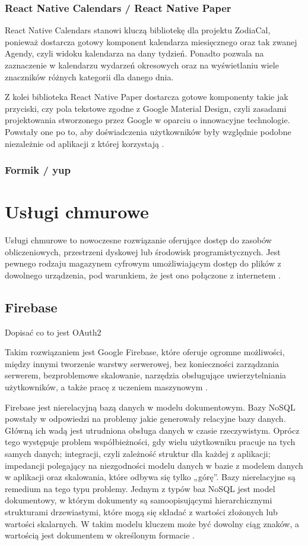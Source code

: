 \subsubsection*{\textbf{React Native Calendars / React Native Paper}}
React Native Calendars stanowi kluczą bibliotekę dla projektu ZodiaCal, ponieważ dostarcza gotowy komponent kalendarza miesięcznego oraz tak zwanej Agendy, czyli widoku kalendarza na dany tydzień. Ponadto pozwala na zaznaczenie w kalendarzu wydarzeń okresowych oraz na wyświetlaniu wiele znaczników różnych kategorii dla danego dnia.

Z kolei biblioteka React Native Paper dostarcza gotowe komponenty takie jak przyciski, czy pola tekstowe zgodne z Google Material Design, czyli zasadami projektowania stworzonego przez Google w oparciu o innowacyjne technologie. Powstały one po to, aby doświadczenia użytkowników były względnie podobne niezależnie od aplikacji z której korzystają \cite{uxui}.

\subsubsection*{\textbf{Formik / yup}}

\section*{\textbf{Usługi chmurowe}}
Usługi chmurowe to nowoczesne rozwiązanie oferujące dostęp do zasobów obliczeniowych, przestrzeni dyskowej lub środowisk programistycznych. Jest pewnego rodzaju magazynem cyfrowym umożliwiającym dostęp do plików z dowolnego urządzenia, pod warunkiem, że jest ono połączone z internetem \cite{cloud}.

\subsection*{\textbf{Firebase}}
Dopisać co to jest OAuth2

Takim rozwiązaniem jest Google Firebase, które oferuje ogromne możliwości, między innymi tworzenie warstwy serwerowej, bez konieczności zarządzania serwerem, bezproblemowe skalowanie, narzędzia obsługujące uwierzytelniania użytkowników, a także pracę z uczeniem maszynowym \cite{firebase}.

Firebase jest nierelacyjną bazą danych w modelu dokumentowym. Bazy NoSQL powstały w odpowiedzi na problemy jakie generowały relacyjne bazy danych. Główną ich wadą jest utrudniona obsługa danych w czasie rzeczywistym. Oprócz tego występuje problem współbieżności, gdy wielu użytkowniku pracuje na tych samych danych; integracji, czyli zależność struktur dla każdej z aplikacji; impedancji polegający na niezgodności modelu danych w bazie z modelem danych w aplikacji oraz skalowania, które odbywa się tylko „górę”. Bazy nierelacyjne są remedium na tego typu problemy. Jednym z typów baz NoSQL jest model dokumentowy, w którym dokumenty są samoopisującymi hierarchicznymi strukturami drzewiastymi, które mogą się składać z wartości złożonych lub wartości skalarnych. W takim modelu kluczem może być dowolny ciąg znaków, a wartością jest dokumentem w określonym formacie \cite{nosql}.

